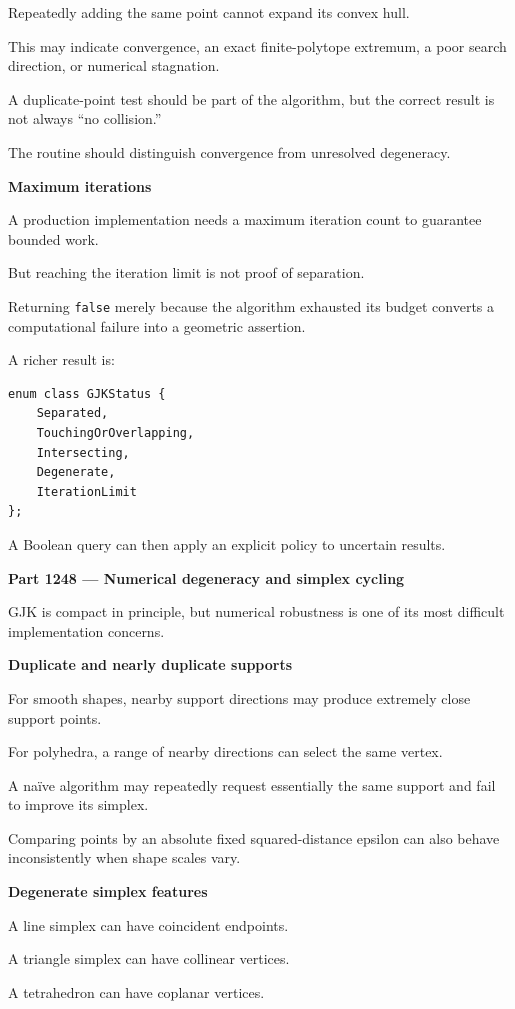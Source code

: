 Repeatedly adding the same point cannot expand its convex hull.

This may indicate convergence, an exact finite-polytope extremum, a poor search direction, or numerical stagnation.

A duplicate-point test should be part of the algorithm, but the correct result is not always ``no collision.''

The routine should distinguish convergence from unresolved degeneracy.

\textbf{Maximum iterations}

A production implementation needs a maximum iteration count to guarantee bounded work.

But reaching the iteration limit is not proof of separation.

Returning \texttt{false} merely because the algorithm exhausted its budget converts a computational failure into a geometric assertion.

A richer result is:

\begin{verbatim}
enum class GJKStatus {
    Separated,
    TouchingOrOverlapping,
    Intersecting,
    Degenerate,
    IterationLimit
};
\end{verbatim}

A Boolean query can then apply an explicit policy to uncertain results.

\textbf{Part 1248 --- Numerical degeneracy and simplex cycling}

GJK is compact in principle, but numerical robustness is one of its most difficult implementation concerns.

\textbf{Duplicate and nearly duplicate supports}

For smooth shapes, nearby support directions may produce extremely close support points.

For polyhedra, a range of nearby directions can select the same vertex.

A naïve algorithm may repeatedly request essentially the same support and fail to improve its simplex.

Comparing points by an absolute fixed squared-distance epsilon can also behave inconsistently when shape scales vary.

\textbf{Degenerate simplex features}

A line simplex can have coincident endpoints.

A triangle simplex can have collinear vertices.

A tetrahedron can have coplanar vertices.

